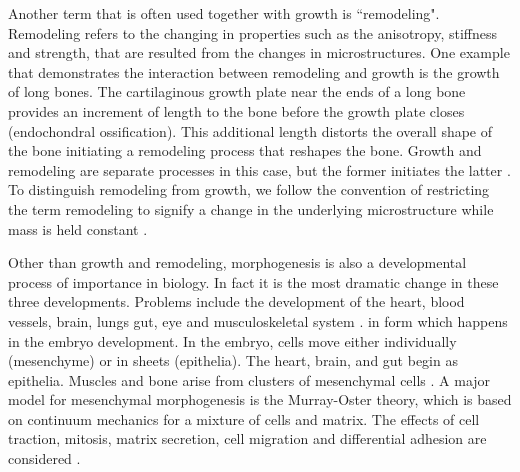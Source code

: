 Another term that is often used together with growth is ``remodeling". Remodeling refers to the changing in properties such as the anisotropy, stiffness and strength, that are resulted from the changes in microstructures. One example that demonstrates the interaction between remodeling and growth is the growth of long bones. The cartilaginous growth plate near the ends of a long bone provides an increment of length to the bone before the growth plate closes (endochondral ossification). This additional length distorts the overall shape of the bone initiating a remodeling process that reshapes the bone. Growth and remodeling are separate processes in this case, but the former initiates the latter \cite{Ambrosi}. To distinguish remodeling from growth, we follow the convention of restricting the term remodeling to signify a change in the underlying microstructure while mass is held constant \cite{Kuhl4, Garikipati3}.

Other than growth and remodeling, morphogenesis is  also a developmental process of importance in biology. In fact it is the most dramatic change in these three developments. Problems include the development of the heart, blood vessels, brain, lungs gut, eye and musculoskeletal system \cite{Murray}. in form which happens in the embryo development. In the embryo, cells move either individually (mesenchyme) or in sheets (epithelia). The heart, brain, and gut begin as epithelia. Muscles and bone arise from clusters of mesenchymal cells \cite{Ambrosi}. A major model for mesenchymal morphogenesis is the Murray-Oster theory, which is based on continuum mechanics for a mixture of cells and matrix. The effects of cell traction, mitosis, matrix secretion, cell migration and differential adhesion are considered \cite{Murray2, Oster}.

